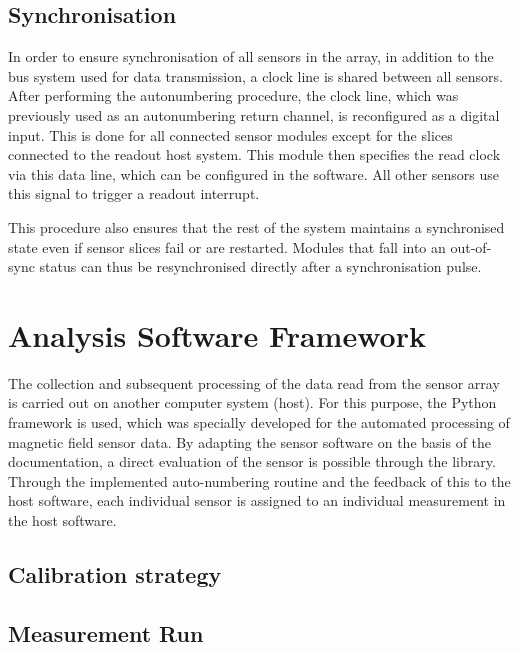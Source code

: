\documentclass[conference]{IEEEtran}
\begin{document}
    


\subsection{Synchronisation}

In order to ensure synchronisation of all sensors in the array, in addition to the bus system used for data transmission, a clock line is shared between all sensors.
After performing the autonumbering procedure, the clock line, which was previously used as an autonumbering return channel, is reconfigured as a digital input.
This is done for all connected sensor modules except for the slices connected to the readout host system.
This module then specifies the read clock via this data line, which can be configured in the software.
All other sensors use this signal to trigger a readout interrupt.

This procedure also ensures that the rest of the system maintains a synchronised state even if sensor slices fail or are restarted.
Modules that fall into an out-of-sync status can thus be resynchronised directly after a synchronisation pulse.


\section{Analysis Software Framework}

The collection and subsequent processing of the data read from the sensor array is carried out on another computer system (host).
For this purpose, the Python framework is used, which was specially developed for the automated processing of magnetic field sensor data.
By adapting the sensor software on the basis of the documentation, a direct evaluation of the sensor is possible through the library.
Through the implemented auto-numbering routine and the feedback of this to the host software, each individual sensor is assigned to an individual measurement in the host software.


\subsection{Calibration strategy}


\subsection{Measurement Run}
\end{document}
